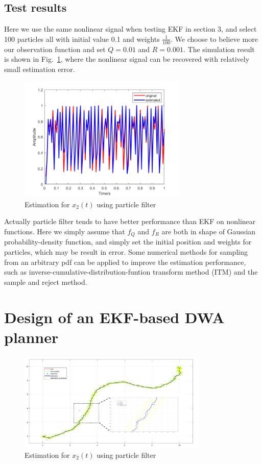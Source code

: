 \documentclass[conference]{IEEEtran}
\begin{document}
	
	\subsection{Test results}
	
	Here we use the same nonlinear signal when testing EKF in section 3, and select 100 particles all with initial value 0.1 and weights $\frac{1}{100}$. We choose to believe more our observation function and set $Q=0.01$ and $R=0.001$. The simulation result is shown in Fig.~\ref{fig5}, where the nonlinear signal can be recovered with relatively small estimation error.
	
	\begin{figure}[H]
		\centering
		\includegraphics[width=8cm]{fig8.png}
		\caption{Estimation for $x_{2}(t)$ using particle filter}
		\label{fig5}
	\end{figure}

	Actually particle filter tends to have better performance than EKF on nonlinear functions. Here we simply assume that $f_{Q}$ and $f_{R}$ are both in shape of Gaussian probability-density function, and simply set the initial position and weights for particles, which may be result in error. Some numerical methods for sampling from an arbitrary pdf can be applied to improve the estimation performance, such as inverse-cumulative-distribution-funtion transform method (ITM) and the sample and reject method. 
	
	\section{Design of an EKF-based DWA planner}
	
	\begin{figure}[H]
		\centering
		\includegraphics[width=9cm]{fig7.png}
		\caption{Estimation for $x_{2}(t)$ using particle filter}
		\label{fig6}
	\end{figure}
	
\end{document}
